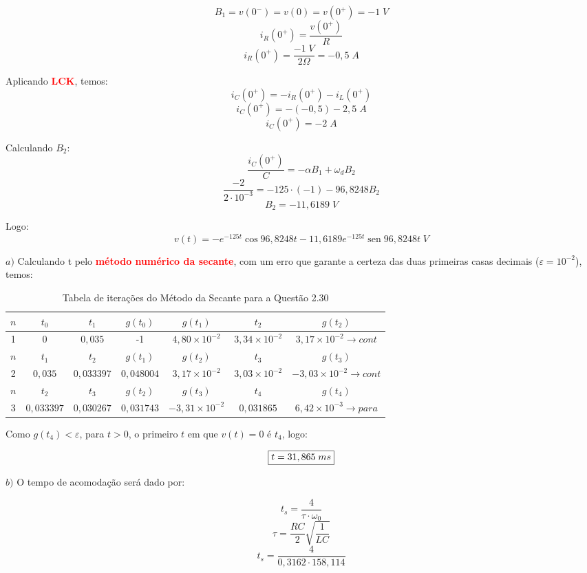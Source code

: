 \documentclass[
	12pt,				%
	oneside,			%
	a4paper,			%
	english,			%
	french,				%
	spanish,			%
	brazil				%
	]{abntex2}
\DeclareMathOperator{\sen}{sen}
\begin{document}
$$B_1=v(0^-)=v(0)=v(0^+)=-1\;V$$
$$i_R(0^+)=\dfrac{v(0^+)}{R}$$
$$i_R(0^+)=\dfrac{-1\;V}{2\Omega}=-0,5\;A $$

Aplicando \textbf{\textcolor{red}{LCK}}, temos:
$$i_C(0^+)=-i_R(0^+)-i_L(0^+)$$
$$i_C(0^+)=-(-0,5)-2,5\;A$$
$$i_C(0^+)=-2\;A $$

Calculando $B_2$:
$$\dfrac{i_C(0^+)}{C}=-\alpha B_1+\omega_dB_2$$
$$\dfrac{-2}{2\cdot10^{-3}}=-125\cdot(-1)-96,8248B_2$$
$$B_2=-11,6189\;V$$

Logo:
$$v(t)=-e^{-125t}\cos{96,8248t}-11,6189e^{-125t}\sen{96,8248t}\;V$$

\newpage
$a)$ Calculando t pelo \textbf{\textcolor{red}{método numérico da secante}}, com um erro que garante a certeza das duas primeiras casas decimais ($\varepsilon = 10^{-2}$), temos:

\begin{table}[!htb]
	\centering
	\begin{tabular}{c|c|c|c|c|c|c}
		\hline		
		$n$ & $t_0$ & $t_1$ & $g(t_0)$ & $g(t_1)$ & $t_2$ & $g(t_2)$\\
		\hline
		1 & 0 & $0,035$ & -1 & $4,80\times 10^{-2}$ & $3,34\times 10^{-2}$ & $3,17\times 10^{-2} \rightarrow cont$ \\
		\hline
		\hline
		$n$ & $t_1$ & $t_2$ & $g(t_1)$ & $g(t_2)$ & $t_3$ & $g(t_3)$ \\
		\hline
		2 & $0,035$ & $0,033397$ & $0,048004$ & $3,17\times 10^{-2}$ & $3,03\times 10^{-2}$ & $-3,03\times 10^{-2}\rightarrow cont$ \\
		\hline
		\hline
		$n$ & $t_2$ & $t_3$ & $g(t_2)$ & $g(t_3)$ & $t_4$ & $g(t_4)$\\
		\hline
		3 & $0,033397$ & $0,030267$ & $0,031743$ & $-3,31\times 10^{-2}$ & $0,031865$ & $6,42\times 10^{-3}\rightarrow para$ \\
		\hline
	\end{tabular}
	\caption{Tabela de iterações do Método da Secante para a Questão 2.30}
	\label{tabela-1}
\end{table}

Como $g(t_4) < \varepsilon$, para $t>0$, o primeiro $t$ em que $v(t)=0$ é $t_4$, logo:

\begin{equation}
    \fbox{$t=31,865\;ms$}
\end{equation}

$b)$ O tempo de acomodação será dado por:

$$t_s=\dfrac{4}{\tau \cdot \omega_0}$$
$$\tau=\dfrac{RC}{2}\sqrt{\dfrac{1}{LC}}$$
$$t_s=\dfrac{4}{0,3162\cdot158,114}$$
\end{document}
